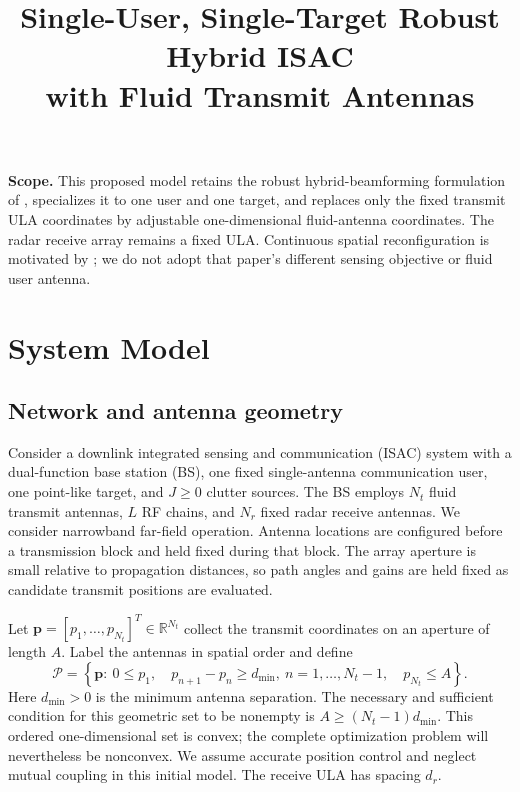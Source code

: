\documentclass[11pt]{article}
\title{Single-User, Single-Target Robust Hybrid ISAC\\with Fluid Transmit Antennas}
\author{}
\date{}
\newcommand{\pos}{\mathbf p}
\begin{document}
\maketitle
\noindent\textbf{Scope.} This proposed model retains the robust hybrid-beamforming
formulation of \cite{wang2026}, specializes it to one user and one target, and
replaces only the fixed transmit ULA coordinates by adjustable one-dimensional
fluid-antenna coordinates. The radar receive array remains a fixed ULA.
Continuous spatial reconfiguration is motivated by \cite{zhou2024}; we do not
adopt that paper's different sensing objective or fluid user antenna.

\section{System Model}
\subsection{Network and antenna geometry}
Consider a downlink integrated sensing and communication (ISAC) system with a
dual-function base station (BS), one fixed single-antenna communication user,
one point-like target, and $J\geq0$ clutter sources. The BS employs $N_t$ fluid
transmit antennas, $L$ RF chains, and $N_r$ fixed radar receive antennas.
We consider narrowband far-field operation. Antenna locations are configured
before a transmission block and held fixed during that block. The array
aperture is small relative to propagation distances, so path angles and gains
are held fixed as candidate transmit positions are evaluated.

Let $\pos=[p_1,\ldots,p_{N_t}]^T\in\mathbb R^{N_t}$ collect the transmit
coordinates on an aperture of length $A$. Label the antennas in spatial order
and define
\begin{equation}
 \mathcal P=\left\{\pos:\ 0\leq p_1,\quad
 p_{n+1}-p_n\geq d_{\min},\ n=1,\ldots,N_t-1,\quad p_{N_t}\leq A\right\}.
 \label{eq:positions}
\end{equation}
Here $d_{\min}>0$ is the minimum antenna separation. The necessary and
sufficient condition for this geometric set to be nonempty is
$A\geq(N_t-1)d_{\min}$. This ordered one-dimensional set is convex;
the complete optimization problem will nevertheless be nonconvex.
We assume accurate position control and neglect mutual coupling in this
initial model. The receive ULA has spacing $d_r$.
\end{document}
